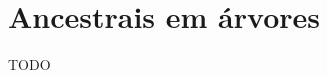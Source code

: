 \documentclass[../../main.tex]{subfiles}
\begin{document}
\chapter{Ancestrais em árvores} \label{cap:ancestrais}
TODO
\end{document}
